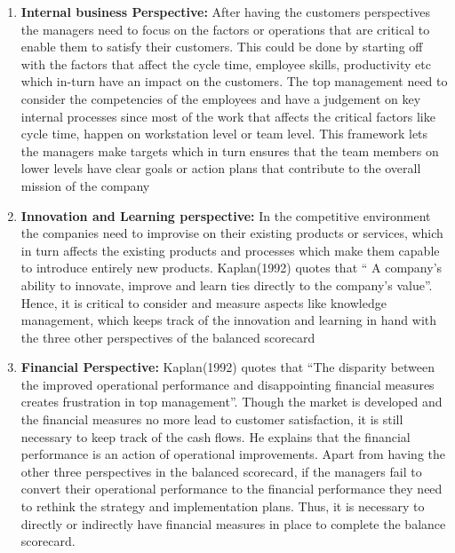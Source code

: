 \begin{enumerate}
\begin{enumerate}
  \end{enumerate}
  \item \textbf{Internal business Perspective:}
  After having the customers perspectives the managers need to focus on the factors or operations that are critical to enable them to satisfy their customers. This could be done by starting off with the factors that affect the cycle time, employee skills, productivity etc which in-turn have an impact on the customers. The top management need to consider the competencies of the employees and have a judgement on key internal processes since most of the work that affects the critical factors like cycle time, happen on workstation level or team level. This framework lets the managers make targets which in turn ensures that the team members on lower levels have clear goals or action plans that contribute to the overall mission of the company\\
  \item \textbf{Innovation and Learning perspective:}
  In the competitive environment the companies need to improvise on their existing products or services, which in turn affects the existing products and processes which make them capable to introduce entirely new products. Kaplan(1992) quotes that “ A company’s ability to innovate, improve and learn ties directly to the company’s value”. Hence, it is critical to consider and measure aspects like knowledge management, which keeps track of the innovation and learning in hand with the three other perspectives of the balanced scorecard \\
  \item \textbf{Financial Perspective:}
  Kaplan(1992) quotes that “The disparity between the improved operational performance and disappointing financial measures creates frustration in top management”. Though the market is developed and the financial measures no more lead to customer satisfaction, it is still necessary to keep track of the cash flows. He explains that the financial performance is an action of operational improvements. Apart from having the other three perspectives in the balanced scorecard, if the managers fail to convert their operational performance to the financial performance they need to rethink the strategy and implementation plans. Thus, it is necessary to directly or indirectly have financial measures in place to complete the balance scorecard.\\
\end{enumerate}

